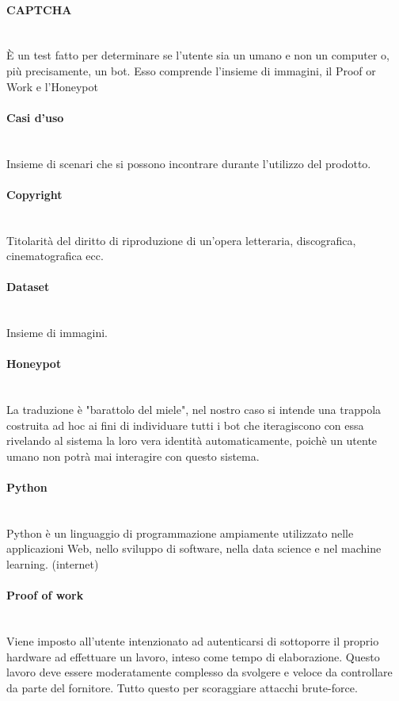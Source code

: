 \paragraph{CAPTCHA}~\smallskip \\
È un test fatto per determinare se l'utente sia un umano e non un computer o, più precisamente, un bot.
Esso comprende l'insieme di immagini, il Proof or Work e l'Honeypot

\paragraph{Casi d'uso}~\smallskip \\
Insieme di scenari che si possono incontrare durante l'utilizzo del prodotto.

\paragraph{Copyright}~\smallskip \\
Titolarità del diritto di riproduzione di un'opera letteraria, discografica, cinematografica ecc.

\paragraph{Dataset}~\smallskip \\
Insieme di immagini.

\paragraph{Honeypot}~\smallskip \\
La traduzione è "barattolo del miele", nel nostro caso si intende una trappola costruita ad hoc ai fini di individuare tutti i bot che iteragiscono con essa rivelando al sistema la loro vera identità automaticamente, poichè un utente umano non potrà mai interagire con questo sistema.

\paragraph{Python}~\smallskip \\
Python è un linguaggio di programmazione ampiamente utilizzato nelle applicazioni Web, nello sviluppo di software, nella data science e nel machine learning. (internet)

\paragraph{Proof of work}~\smallskip \\
Viene imposto all'utente intenzionato ad autenticarsi di sottoporre il proprio hardware ad effettuare un lavoro, inteso come tempo di elaborazione. Questo lavoro deve essere moderatamente complesso da svolgere e veloce da controllare da parte del fornitore. Tutto questo per scoraggiare attacchi brute-force.

